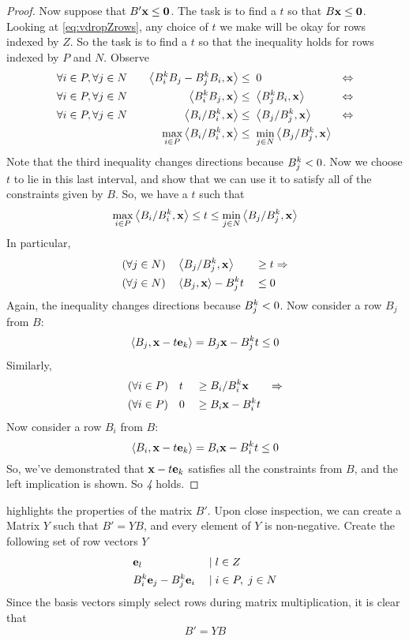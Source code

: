 \begin{proof}
	Now suppose that $B'\mathbf{x} \leq \mathbf{0}$.  The task is to find a $t$ so that $B\mathbf{x} \leq \mathbf{0}$.  Looking at \eqref{eq:vdropZrows}, any choice of $t$ we make will be okay for rows indexed by $Z$.  So the task is to find a $t$ so that the inequality holds for rows indexed by $P$ and $N$.  Observe
	\begin{alignat*}{3}
		\forall i\in P,\forall j \in N & \quad & \left\langle B^k_i B_j - B^k_j B_i, \mathbf{x} \right\rangle    & \leq  \; 0                                & \Leftrightarrow \\
		\forall i\in P,\forall j \in N & \quad & \left\langle B^k_i B_j, \mathbf{x} \right\rangle               & \leq  \; \left\langle B^k_j B_i, \mathbf{x} \right\rangle                & \Leftrightarrow \\
		\forall i\in P,\forall j \in N & \quad & \left\langle B_i/B^k_i, \mathbf{x} \right\rangle               & \leq  \; \left\langle B_j/B^k_j, \mathbf{x} \right\rangle                & \Leftrightarrow \\
		      & \quad & \max_{i\in P} \left\langle B_i/B^k_i, \mathbf{x} \right\rangle & \leq  \; \min_{j\in N}  \left\langle B_j/B^k_j, \mathbf{x} \right\rangle &
	\end{alignat*}
	Note that the third inequality changes directions because $B^k_j < 0$.  Now we choose $t$ to lie in this last interval, and show that we can use it to satisfy all of the constraints given by $ B$.  So, we have a $t$ such that
	\[ \max_{i\in P} \left\langle B_i/B^k_i, \mathbf{x} \right\rangle \leq t \leq \min_{j\in N} \left\langle B_j/B^k_j, \mathbf{x} \right\rangle \]
	In particular,
	\begin{alignat*}{2}
		(\forall j\in N)\quad & \left\langle B_j/B^k_j, \mathbf{x} \right\rangle     \; & \geq & \; t \Rightarrow \\
		(\forall j\in N)\quad & \left\langle B_j, \mathbf{x} \right\rangle - B^k_j t \; & \leq & \; 0
	\end{alignat*}
	Again, the inequality changes directions because $B^k_j < 0$.  Now consider a row $ B_j$ from $ B$:
	\[ \left\langle B_j, \mathbf{x}-t\mathbf{e}_k \right\rangle =  B_j {\mathbf{x}} - B^k_j t \leq 0 \]
	Similarly,
	\begin{alignat*}{3}
		(\forall i\in P)\quad & t \; & \geq & \;  B_i/B^k_i {\mathbf{x}}     & \Rightarrow \\
		(\forall i\in P)\quad & 0 \; & \geq & \;  B_i {\mathbf{x}} - B^k_i t &
	\end{alignat*}
	Now consider a row $ B_i$ from $ B$:
	\[ \left\langle B_i, \mathbf{x}-t\mathbf{e}_k \right\rangle =  B_i {\mathbf{x}} - B^k_i t \leq 0 \]
	So, we've demonstrated that $\mathbf{x}-t\mathbf{e}_k$ satisfies all the constraints from $B$, and the left implication is shown.  So \textit{4} holds.
\end{proof}

\begin{Remark}\label{fm_matrix}
	  highlights the properties of the matrix $B'$.  Upon close inspection, we can create a Matrix $Y$ such that $B' = YB$, and every element of $Y$ is non-negative.  Create the following set of row vectors $Y$
	\begin{alignat*}{2}
		 & \mathbf{e}_l                  & \;|\; & l \in Z          \\
		 & B^k_i \mathbf{e}_j - B^k_j \mathbf{e}_i & \;|\; & i\in P,\; j\in N
	\end{alignat*}
	Since the basis vectors simply select rows during matrix multiplication, it is clear that
	\[ B' = YB \]
\end{Remark}

